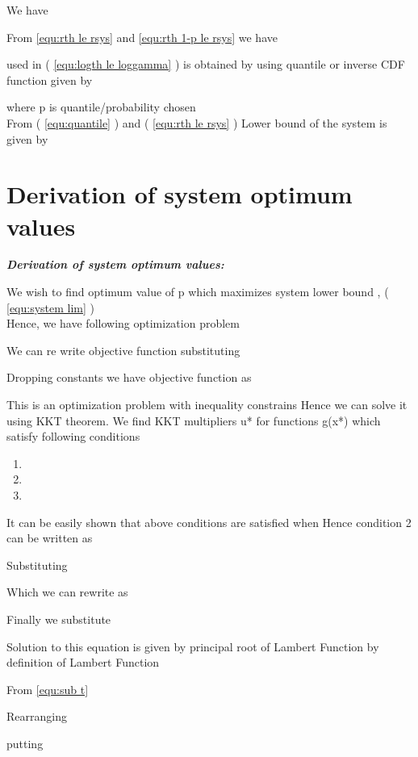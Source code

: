 \documentclass[conference]{IEEEtran}
\begin{document}
We have

 

From \ref{equ:rth le rsys} and \ref{equ:rth 1-p  le rsys}
 we have  


 used in ( \ref{equ:logth le loggamma} ) is obtained by using quantile or inverse CDF function given by 

where p is quantile/probability  chosen\\ 

From ( \ref{equ:quantile} ) and ( \ref{equ:rth le rsys} ) Lower bound of the system is given by  

 
\vspace{25pt} 
 

\section{Derivation of system optimum values}
\label{Appendix:optimzation}
\textbf{\emph{Derivation of system optimum values:}}

\vspace{25pt}

We wish to find optimum value of p which maximizes system lower bound , ( \ref{equ:system lim} )\\

Hence, we have following optimization problem 
 

 
We can re write objective function substituting  
 
Dropping constants we have objective function as 
 
This is an optimization problem with inequality constrains
Hence we can solve it using KKT theorem.
We find KKT multipliers u* for functions g(x*) which satisfy following conditions

\begin{enumerate}


\item 
\item 
\item 
\end{enumerate} 
 

It can be easily shown that above conditions are satisfied when  
Hence condition 2 can be written as

Substituting 

 

Which we can rewrite as 
 
Finally we substitute  
 
Solution to this equation is given by principal root of Lambert Function  \cite{Lambert_W}
 by definition of Lambert Function 
 
 
From \ref{equ:sub t}
 
Rearranging
 


putting 


\nocite{Tse04fundamentalsof}





\end{document}
